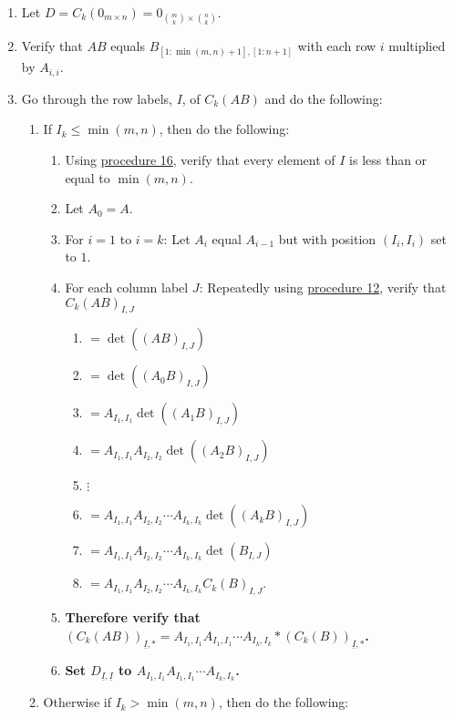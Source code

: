 \documentclass[twocolumn]{article}
\newcommand{\ul}[1]{\underline{#1}}
\begin{document}
				\begin{enumerate}
					\item Let $D=C_k(0_{m\times n})=0_{\binom{m}{k}\times\binom{n}{k}}$.
					\item Verify that $AB$ equals $B_{[1:\min(m,n)+1],[1:n+1]}$ with each row $i$ multiplied by $A_{i,i}$.
					\item Go through the row labels, $I$, of $C_k(AB)$ and do the following:
					\begin{enumerate}
						\item If $I_k\le \min(m,n)$, then do the following:
						\begin{enumerate}
							\item Using \hyperref[sec:procedure 16]{procedure 16}, verify that every element of $I$ is less than or equal to $\min(m,n)$.
							\item Let $A_0=A$.
							\item For $i=1$ to $i=k$: Let $A_i$ equal $A_{i-1}$ but with position $(I_i,I_i)$ set to $1$.
							\item For each column label $J$: Repeatedly using \hyperref[sec:procedure 12]{procedure 12}, verify that ${C_k(AB)}_{I,J}$
							\begin{enumerate}
								\item $=\det((AB)_{I,J})$
								\item $=\det((A_0B)_{I,J})$
								\item $=A_{I_1,I_1}\det((A_1B)_{I,J})$
								\item $=A_{I_1,I_1}A_{I_2,I_2}\det((A_2B)_{I,J})$
								\item $\vdots$
								\item $=A_{I_1,I_1}A_{I_2,I_2}\cdots A_{I_k,I_k}\det((A_kB)_{I,J})$
								\item $=A_{I_1,I_1}A_{I_2,I_2}\cdots A_{I_k,I_k}\det(B_{I,J})$
								\item $=A_{I_1,I_1}A_{I_2,I_2}\cdots A_{I_k,I_k}{C_k(B)}_{I,J}$.
							\end{enumerate}
							\item \textbf{Therefore verify that $(C_k(AB))_{\ul{I},*}=A_{I_1,I_1}A_{I_1,I_1}\cdots A_{I_k,I_k}*(C_k(B))_{\ul{I},*}$.}
							\item \textbf{Set $D_{\ul{I},\ul{I}}$ to $A_{I_1,I_1}A_{I_1,I_1}\cdots A_{I_k,I_k}$.}
						\end{enumerate}
						\item Otherwise if $I_k>\min(m,n)$, then do the following:
						\begin{enumerate}

\end{enumerate}
\end{enumerate}
\end{enumerate}
\end{document}
